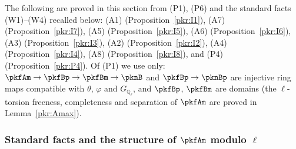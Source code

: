 \documentclass[10pt]{amsart}
\theoremstyle{definition}
\theoremstyle{remark}
\newcommand{\Q}{\mathbb Q}
\begin{document}
The following are proved in this section from (P1), (P6) and the standard facts (W1)--(W4)
recalled below: (A1) (Proposition~\ref{pkr:I1}), (A7) (Proposition~\ref{pkr:I7}), (A5)
(Proposition~\ref{pkr:I5}), (A6) (Proposition~\ref{pkr:I6}), (A3) (Proposition~\ref{pkr:I3}), (A2)
(Proposition~\ref{pkr:I2}), (A4) (Proposition~\ref{pkr:I4}), (A8) (Proposition~\ref{pkr:I8}), and
(P4) (Proposition~\ref{pkr:P4}). Of (P1) we use only: $\pkfAm\to\pkfBp\to\pkfBm\to\pknB$ and
$\pkfBp\to\pknBp$ are injective ring maps compatible with $\theta$, $\varphi$ and $G_{\Q_\ell}$, and
$\pkfBp$, $\pkfBm$ are domains (the $\ell$-torsion freeness, completeness and separation of $\pkfAm$
are proved in Lemma~\ref{pkr:Amax}).

\subsubsection{Standard facts and the structure of $\pkfAm$ modulo $\ell$}\label{pkr:ss-prelim}
\end{document}
